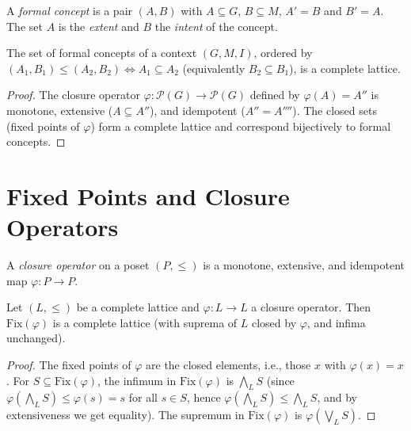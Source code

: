 \begin{definition}
A \emph{formal concept} is a pair $(A, B)$ with $A \subseteq G$, $B \subseteq M$,
$A' = B$ and $B' = A$. The set $A$ is the \emph{extent} and $B$ the \emph{intent} of the
concept.
\end{definition}

\begin{theorem}
\label{thm:concept-lattice}
The set of formal concepts of a context $(G, M, I)$, ordered by
$(A_1, B_1) \leq (A_2, B_2) \Leftrightarrow A_1 \subseteq A_2$ (equivalently
$B_2 \subseteq B_1$), is a complete lattice.
\end{theorem}

\begin{proof}
The closure operator $\varphi\colon \mathcal{P}(G) \to \mathcal{P}(G)$ defined by
$\varphi(A) = A''$ is monotone, extensive ($A \subseteq A''$), and idempotent
($A'' = A''''$). The closed sets (fixed points of $\varphi$) form a complete lattice and
correspond bijectively to formal concepts.
\end{proof}

\section{Fixed Points and Closure Operators}

\begin{definition}
A \emph{closure operator} on a poset $(P, \leq)$ is a monotone, extensive, and idempotent
map $\varphi\colon P \to P$.
\end{definition}

\begin{theorem}
Let $(L, \leq)$ be a complete lattice and $\varphi\colon L \to L$ a closure operator. Then
$\mathrm{Fix}(\varphi)$ is a complete lattice (with suprema of $L$ closed by $\varphi$,
and infima unchanged).
\end{theorem}

\begin{proof}
The fixed points of $\varphi$ are the closed elements, i.e., those $x$ with
$\varphi(x) = x$. For $S \subseteq \mathrm{Fix}(\varphi)$, the infimum in
$\mathrm{Fix}(\varphi)$ is $\bigwedge_L S$ (since $\varphi(\bigwedge_L S) \leq
\varphi(s) = s$ for all $s \in S$, hence $\varphi(\bigwedge_L S) \leq \bigwedge_L S$,
and by extensiveness we get equality). The supremum in $\mathrm{Fix}(\varphi)$ is
$\varphi(\bigvee_L S)$.
\end{proof}

